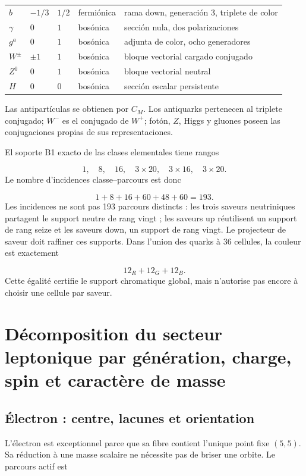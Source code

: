 \begin{longtable}{L{2.03cm}L{2.03cm}L{1.87cm}L{2.34cm}L{6.55cm}}
\(b\) & \(-1/\allowbreak{}3\) & \(1/\allowbreak{}2\) & fermiónica & rama down, generación 3, triplete de color \\
\(\gamma\) & \(0\) & \(1\) & bosónica & sección nula, dos polarizaciones \\
\(g^a\) & \(0\) & \(1\) & bosónica & adjunta de color, ocho generadores \\
\(W^\pm\) & \(\pm1\) & \(1\) & bosónica & bloque vectorial cargado conjugado \\
\(Z^0\) & \(0\) & \(1\) & bosónica & bloque vectorial neutral \\
\(H\) & \(0\) & \(0\) & bosónica & sección escalar persistente \\
\end{longtable}
\endgroup
Las antipartículas se obtienen por \(C_M\). Los antiquarks pertenecen al triplete conjugado; \(W^-\) es el conjugado de \(W^+\); fotón, \(Z\), Higgs y gluones poseen las conjugaciones propias de sus representaciones.

El soporte B1 exacto de las clases elementales tiene rangos

\[
 1,\quad8,\quad16,\quad
 3\times20,\quad
 3\times16,\quad
 3\times20.
\]
Le nombre d'incidences classe--parcours est donc

\[
 1+8+16+60+48+60=193.
\]
Les incidences ne sont pas 193 parcours distincts : les trois saveurs neutriniques partagent le support neutre de rang vingt ; les saveurs up réutilisent un support de rang seize et les saveurs down, un support de rang vingt. Le projecteur de saveur doit raffiner ces supports. Dans l'union des quarks à 36 cellules, la couleur est exactement

\[
 12_R+12_G+12_B.
\]
Cette égalité certifie le support chromatique global, mais n'autorise pas encore à choisir une cellule par saveur.

\section{Décomposition du secteur leptonique par génération, charge, spin et caractère de masse}
\subsection{Électron : centre, lacunes et orientation}
L'électron est exceptionnel parce que sa fibre contient l'unique point fixe \((5,5)\). Sa réduction à une masse scalaire ne nécessite pas de briser une orbite. Le parcours actif est

